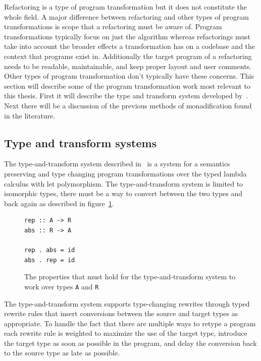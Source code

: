 Refactoring is a type of program transformation but it does not constitute the whole field. A major difference between refactoring and other types of program transformations is scope that a refactoring must be aware of. Program transformations typically focus on just the algorithm whereas refactorings must take into account the broader effects a transformation has on a codebase and the context that programs exist in. Additionally the target program of a refactoring needs to be readable, maintainable, and keep proper layout and user comments. Other types of program transformation don't typically have these concerns. This section will describe some of the program transformation work most relevant to this thesis. First it will describe the type and transform system developed by~\citep{typeAndTransformSemantics}. Next there will be a discussion of the previous methods of monadification found in the literature. 

\subsection{Type and transform systems}

The type-and-transform system described in~\citep{typeAndTransformSemantics} is a system for a semantics preserving and type changing program transformations over the typed lambda calculus with let polymorphism. The type-and-transform system is limited to isomorphic types, there must be a way to convert between the two types and back again as described in figure~\ref{transformIso}.

\begin{figure}[t]
\begin{lstlisting}
rep :: A -> R
abs :: R -> A

rep . abs = id
abs . rep = id
\end{lstlisting}
\caption{The properties that must hold for the type-and-transform system to work over types \texttt{A} and \texttt{R}}
\label{transformIso}
\end{figure} 

The type-and-transform system supports type-changing rewrites through typed rewrite rules that insert conversions between the source and target types as appropriate. To handle the fact that there are multiple ways to retype a program each rewrite rule is weighted to maximize the use of the target type, introduce the target type as soon as possible in the program, and delay the conversion back to the source type as late as possible.

